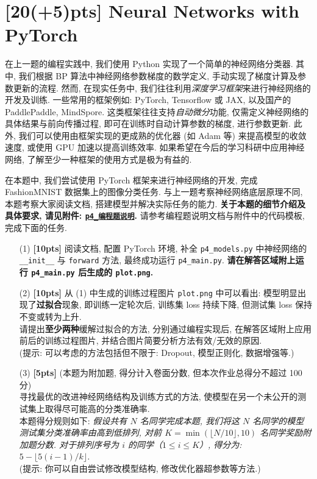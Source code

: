 \documentclass[a4paper,UTF8]{article}
\numberwithin{equation}{section}
\theoremstyle{definition}
\begin{document}
\newpage

\section{[20(+5)pts] Neural Networks with PyTorch}

\begin{tcolorbox}
在上一题的编程实践中, 我们使用 Python 实现了一个简单的神经网络分类器. 其中, 我们根据 BP 算法中神经网络参数梯度的数学定义, 手动实现了梯度计算及参数更新的流程. 然而, 在现实任务中, 我们往往利用\textit{深度学习框架}来进行神经网络的开发及训练. 一些常用的框架例如: PyTorch, Tensorflow 或 JAX, 以及国产的 PaddlePaddle, MindSpore. 这类框架往往支持\textit{自动微分}功能, 仅需定义神经网络的具体结果与前向传播过程, 即可在训练时自动计算参数的梯度, 进行参数更新. 此外, 我们可以使用由框架实现的更成熟的优化器 (如 Adam 等) 来提高模型的收敛速度, 或使用 GPU 加速以提高训练效率. 如果希望在今后的学习科研中应用神经网络, 了解至少一种框架的使用方式是极为有益的.
\end{tcolorbox}

在本题中, 我们尝试使用 PyTorch 框架来进行神经网络的开发, 完成 FashionMNIST 数据集上的图像分类任务. 与上一题考察神经网络底层原理不同, 本题考察大家阅读文档, 搭建模型并解决实际任务的能力. \textbf{关于本题的细节介绍及具体要求, 请见附件: \href{https://www.lamda.nju.edu.cn/ML2024Spring/homework/HW3/p4_guide.pdf}{\texttt{p4\hspace{0em}\_\hspace{0em}编程题说明}}.} 请参考编程题说明文档与附件中的代码模板, 完成下面的任务.

\begin{enumerate}
    \item [(1)] \textbf{[10pts]} 阅读文档, 配置 PyTorch 环境, 补全 \texttt{p4\_models.py} 中神经网络的 \texttt{\_\_init\_\_} 与 \texttt{forward} 方法, 最终成功运行 \texttt{p4\_main.py}. \textbf{请在解答区域附上运行 \texttt{p4\_main.py} 后生成的 \texttt{plot.png}.}
    \item [(2)] \textbf{[10pts]} 从 (1) 中生成的训练过程图片 \texttt{plot.png} 中可以看出: 模型明显出现了\textbf{过拟合}现象, 即训练一定轮次后, 训练集 loss 持续下降, 但测试集 loss 保持不变或转为上升. \\请提出\textbf{至少两种}缓解过拟合的方法, 分别通过编程实现后, 在解答区域附上应用前后的训练过程图片, 并结合图片简要分析方法有效/无效的原因.\\(提示: 可以考虑的方法包括但不限于: Dropout, 模型正则化, 数据增强等.)
    \item [(3)] \textbf{[5pts]} (本题为附加题, 得分计入卷面分数, 但本次作业总得分不超过 100 分)\\
    寻找最优的改进神经网络结构及训练方式的方法, 使模型在另一个未公开的测试集上取得尽可能高的分类准确率.\\本题得分规则如下: \textit{假设共有 $N$ 名同学完成本题, 我们将这 $N$ 名同学的模型测试集分类准确率由高到低排列, 对前 $K=\min\left(\lfloor N/10\rfloor, 10\right)$ 名同学奖励附加题分数. 对于排列序号为 $i$ 的同学（$1 \leq i \leq K$）, 得分为: $5 - \lfloor 5(i-1)/k \rfloor$.}\\
    (提示: 你可以自由尝试修改模型结构, 修改优化器超参数等方法.)
\end{enumerate}
\end{document}
